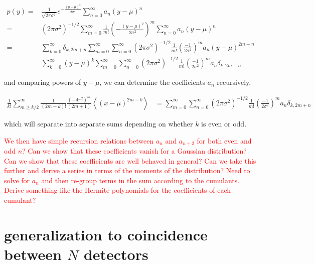 \documentclass{article}
\newcommand{\e}[1]{\left<#1\right>}
\begin{document}
\begin{subequations}
	\begin{align}
		p(y) = & \frac{1}{\sqrt{2\pi\sigma^2}} e^{-\frac{(y-\mu)^2}{2\sigma^2}} \sum_{n=0}^{\infty} a_n (y-\mu)^n \\
		     = & (2\pi\sigma^2)^{-1/2} \sum_{m=0}^{\infty} \frac{1}{m!} \left( - \frac{(y-\mu)^2}{2\sigma^2} \right)^m \sum_{n=0}^{\infty} a_n (y-\mu)^{n} \\
		     = & \sum_{k=0}^{\infty} \delta_{k,2m+n} \sum_{m=0}^{\infty} \sum_{n=0}^{\infty} (2\pi\sigma^2)^{-1/2} \frac{1}{m!} \left( \frac{-1}{2\sigma^2} \right)^m a_n (y-\mu)^{2m+n} \\
		     = & \sum_{k=0}^{\infty} (y-\mu)^k \sum_{m=0}^{\infty} \sum_{n=0}^{\infty} (2\pi\sigma^2)^{-1/2} \frac{1}{m!} \left( \frac{-1}{2\sigma^2} \right)^m a_n \delta_{k,2m+n}
	\end{align}
\end{subequations}

\noindent
and comparing powers of $y-\mu$, we can determine the coefficients $a_n$ recursively.

\begin{subequations}
	\begin{align}
		\frac{1}{k!} \sum_{m\geq k/2}^{\infty} \frac{1}{(2m-k)!} \frac{(-4\pi^2)^{m}}{(2m+1)} \e{(x-\mu)^{2m-k}} & = \sum_{m=0}^{\infty} \sum_{n=0}^{\infty} (2\pi\sigma^2)^{-1/2} \frac{1}{m!} \left( \frac{-1}{2\sigma^2} \right)^m a_n \delta_{k,2m+n}
	\end{align}
\end{subequations}

\noindent
which will separate into separate sums depending on whether $k$ is even or odd. 

\textcolor{red}{
We then have simple recursion relations between $a_n$ and $a_{n+2}$ for both even and odd $n$?
Can we show that these coefficients vanish for a Gaussian distribution?
Can we show that these coefficients are well behaved in general?
Can we take this further and derive a series in terms of the moments of the distribution?
Need to solve for $a_n$ and then re-group terms in the sum according to the cumulants.
Derive something like the Hermite polynomials for the coefficients of each cumulant?
}

\section{generalization to coincidence between $N$ detectors}
\end{document}
